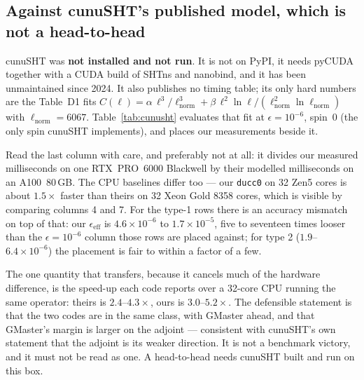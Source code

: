 \documentclass[usenatbib,useAMS]{mnras}
\begin{document}
\subsection{Against cunuSHT's published model, which is not a head-to-head}

cunuSHT was \textbf{not installed and not run}. It is not on PyPI, it needs pyCUDA together with a CUDA build of SHTns and nanobind, and it has been unmaintained since 2024. It also publishes no timing table; its only hard numbers are the Table~D1 fits $C(\ell)=\alpha\,\ell^3/\ell_{\mathrm{norm}}^3+\beta\,\ell^2\ln\ell/(\ell_{\mathrm{norm}}^2\ln\ell_{\mathrm{norm}})$ with $\ell_{\mathrm{norm}}=6067$. Table~\ref{tab:cunusht} evaluates that fit at $\epsilon=10^{-6}$, spin~$0$ (the only spin cunuSHT implements), and places our measurements beside it.

Read the last column with care, and preferably not at all: it divides our measured milliseconds on one RTX~PRO~6000 Blackwell by their modelled milliseconds on an A100~80\,GB. The CPU baselines differ too --- our \texttt{ducc0} on 32 Zen5 cores is about $1.5\times$ faster than theirs on 32 Xeon Gold 8358 cores, which is visible by comparing columns 4 and 7. For the type-1 rows there is an accuracy mismatch on top of that: our $\epsilon_{\mathrm{eff}}$ is $4.6\times10^{-6}$ to $1.7\times10^{-5}$, five to seventeen times looser than the $\epsilon=10^{-6}$ column those rows are placed against; for type 2 ($1.9$--$6.4\times10^{-6}$) the placement is fair to within a factor of a few.

The one quantity that transfers, because it cancels much of the hardware difference, is the speed-up each code reports over a 32-core CPU running the same operator: theirs is $2.4$--$4.3\times$, ours is $3.0$--$5.2\times$. The defensible statement is that the two codes are in the same class, with GMaster ahead, and that GMaster's margin is larger on the adjoint --- consistent with cunuSHT's own statement that the adjoint is its weaker direction. It is not a benchmark victory, and it must not be read as one. A head-to-head needs cunuSHT built and run on this box.
\end{document}

